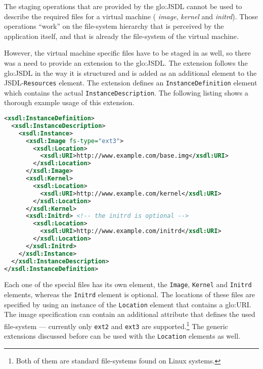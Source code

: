 The staging operations  that are provided by the  \gls{glo:JSDL} cannot be
used  to  describe   the  required  files  for  a   virtual  machine  (\ie
\emph{image}, \emph{kernel} and  \emph{initrd}). Those operations ``work''
on the file-system hierarchy that  is perceived by the application itself,
and that is already the file-system of the virtual machine.

However, the virtual machine specific files  have to be staged in as well,
so there  was a need  to provide an  extension to the  \gls{glo:JSDL}. The
extension follows  the \gls{glo:JSDL} in the  way it is  structured and is
added as an additional element to the JSDL-\texttt{Resources} element. The
extension  defines an  \texttt{InstanceDefinition} element  which contains
the  actual \texttt{InstanceDescription}.  The  following listing  shows a
thorough example usage of this extension.

\begin{center}
  \begin{minipage}{.9\textwidth}
    \begin{lstlisting}[captionpos=b,backgroundcolor=\color{listingcolor},frame=lines,numbers=none,stepnumber=5,numberfirstline=false,numberstyle=\tiny,caption={Example
      of an \texttt{InstanceDefinition} element describing the required
      files of a virtual machine.},label={lst:xbe-xsdl-example},language=XML]
<xsdl:InstanceDefinition>
  <xsdl:InstanceDescription>
    <xsdl:Instance>
      <xsdl:Image fs-type="ext3">
        <xsdl:Location>
          <xsdl:URI>http://www.example.com/base.img</xsdl:URI>
        </xsdl:Location>
      </xsdl:Image>
      <xsdl:Kernel>
        <xsdl:Location>
          <xsdl:URI>http://www.example.com/kernel</xsdl:URI>
        </xsdl:Location>
      </xsdl:Kernel>
      <xsdl:Initrd> <!-- the initrd is optional -->
        <xsdl:Location>
          <xsdl:URI>http://www.example.com/initrd</xsdl:URI>
        </xsdl:Location>
      </xsdl:Initrd>
    </xsdl:Instance>
  </xsdl:InstanceDescription>
</xsdl:InstanceDefinition>
    \end{lstlisting}
  \end{minipage}
\end{center}

Each one of the special files has its own element, \ie the \texttt{Image},
\texttt{Kernel} and \texttt{Initrd}  elements, whereas the \texttt{Initrd}
element is optional.  The locations  of these files are specified by using
an   instance   of  the   \texttt{Location}   element   that  contains   a
\gls{glo:URI}.   The   image  specification  can   contain  an  additional
attribute   that  defines   the  used   file-system  ---   currently  only
\texttt{ext2} and  \texttt{ext3} are supported.\footnote{Both  of them are
  standard file-systems  found on Linux systems.}   The generic extensions
discussed before can be used with the \texttt{Location} elements as well.

